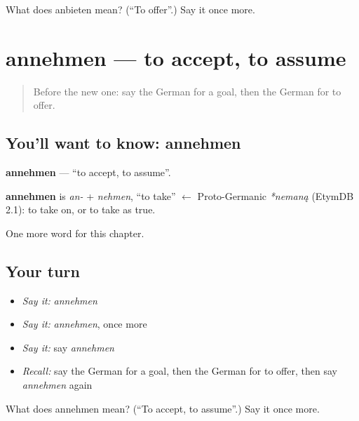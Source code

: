 \begin{tcolorbox}[breakable,colback=teal!4,colframe=teal!35!black,title={Before you move on}]
What does anbieten mean? (\textquotedblleft{}To offer\textquotedblright{}.) Say it once more.
\end{tcolorbox}
\section[annehmen]{annehmen — to accept, to assume}

\label{lesson:GE-C244-annehmen}



\begin{quote}
Before the new one: say the German for a goal, then the German for to offer.
\end{quote}

\subsection*{You'll want to know: annehmen}
\textbf{annehmen} — \textquotedblleft{}to accept, to assume\textquotedblright{}.

\begin{cousinweb}
\textbf{annehmen} is \emph{an-} + \emph{nehmen}, \textquotedblleft{}to take\textquotedblright{} $\leftarrow$ Proto-Germanic \emph{*nemaną} (EtymDB 2.1): to take on, or to take as true.
\end{cousinweb}

\begin{grammarlens}[title={What you've built}]
One more word for this chapter.
\end{grammarlens}

\subsection*{Your turn}
\begin{itemize}
\raggedright
  \item \emph{Say it:} \emph{annehmen}
  \item \emph{Say it:} \emph{annehmen}, once more
  \item \emph{Say it:} say \emph{annehmen}
  \item \emph{Recall:} say the German for a goal, then the German for to offer, then say \emph{annehmen} again
\end{itemize}

\begin{tcolorbox}[breakable,colback=teal!4,colframe=teal!35!black,title={Before you move on}]
What does annehmen mean? (\textquotedblleft{}To accept, to assume\textquotedblright{}.) Say it once more.
\end{tcolorbox}
